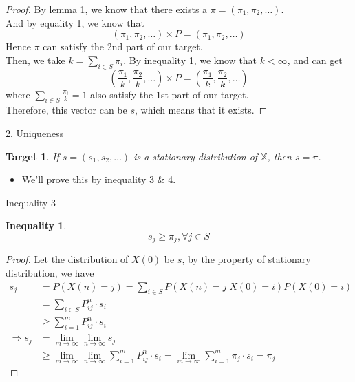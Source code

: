 \documentclass{beamer}
\newtheorem{ineq}{Inequality}
\newtheorem{target}{Target}
\begin{document}
\begin{frame}
	\begin{proof}
		By lemma 1, we know that there exists a $\pi = (\pi_1, \pi_2, \ldots)$. \\
		And by equality 1, we know that
		\[
		(\pi_1, \pi_2, \ldots) \times P = (\pi_1, \pi_2, \ldots)
		\]
		Hence $\pi$ can satisfy the 2nd part of our target. \\
		Then, we take $k = \sum_{i \in S} \pi_i$.
		By inequality 1, we know that $k < \infty$, and can get
		\[
		(\frac{\pi_1}{k}, \frac{\pi_2}{k}, \ldots) \times P = (\frac{\pi_1}{k}, \frac{\pi_2}{k}, \ldots)
		\]
		where $\sum_{i \in S} \frac{\pi_i}{k} = 1$ also satisfy the 1st part of our target. \\
		Therefore, this vector can be $s$, which means that it exists.
	\end{proof}
\end{frame}

\begin{frame}{2. Uniqueness}
	\begin{target}
		If $s = (s_1, s_2, \ldots)$ is a stationary distribution of $\mathbb{X}$, then $s = \pi$.
	\end{target}
	\begin{itemize}
		\item We'll prove this by inequality 3 \& 4.
	\end{itemize}
\end{frame}

\begin{frame}{Inequality 3}
	\begin{ineq}
		\[
		s_j \geq \pi_j, \forall j \in S
		\]
	\end{ineq}
\end{frame}

\begin{frame}
	\begin{proof}
		Let the distribution of $X(0)$ be $s$, by the property of stationary distribution, we have
		\begin{align*}
			             s_j &= P(X(n)=j) = \sum_{i \in S} P(X(n) = j | X(0) = i)P(X(0) = i) \\
			                 &= \sum_{i \in S} P^n_{ij} \cdot s_i \\
			                 &\geq \sum_{i=1}^m P^n_{ij} \cdot s_i \\
			\Rightarrow  s_j &= \lim_{m \to \infty}\lim_{n \to \infty} s_j \\
			                 &\geq \lim_{m \to \infty}\lim_{n \to \infty} \sum_{i=1}^m P^n_{ij} \cdot s_i
			                  = \lim_{m \to \infty}\sum_{i=1}^m \pi_j \cdot s_i = \pi_j
		\end{align*}
	\end{proof}
\end{frame}
\end{document}
